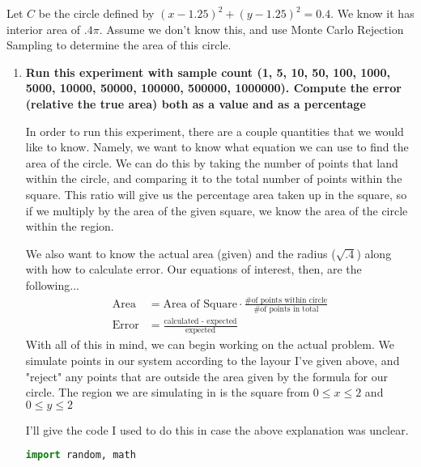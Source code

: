 \documentclass[11pt]{article}
\begin{document}
    Let $C$ be the circle defined by $(x-1.25)^2 + (y-1.25)^2=0.4$. We know it
    has interior area of $.4\pi$. Assume we don't know this, and use Monte
    Carlo Rejection Sampling to determine the area of this circle.

    \begin{enumerate}
        \item \textbf{Run this experiment with sample count (1, 5, 10, 50, 100, 1000, 
            5000, 10000, 50000, 100000, 500000, 1000000).  Compute the error 
            (relative the true area) both as a value and as a percentage}

            In order to run this experiment, there are a couple quantities that
            we would like to know. Namely, we want to know what equation we can
            use to find the area of the circle. We can do this by taking the
            number of points that land within the circle, and comparing it to
            the total number of points within the square. This ratio will give
            us the percentage area taken up in the square, so if we multiply by
            the area of the given square, we know the area of the circle within
            the region.

            We also want to know the actual area (given) and the radius ($\sqrt{.4}$)
            along with how to calculate error. Our equations of interest, then,
            are the following...
            \begin{align*}
                \text{Area} &= \text{Area of Square} \cdot \frac{\text{\# of 
                points within circle}}{\text{\# of points in total}} \\
                \text{Error} &= \frac{\text{calculated - expected}}
                {\text{expected}} 
            \end{align*}
            With all of this in mind, we can begin working on the actual
            problem. We simulate points in our system according to the layour
            I've given above, and "reject" any points that are outside the area
            given by the formula for our circle. The region we are simulating
            in is the square from $0 \leq x \leq 2$ and $0 \leq y \leq 2$

            I'll give the code I used to do this in case the above
            explanation was unclear.
            \newpage

            \begin{lstlisting}[style=mystyle, linewidth=0.94\linewidth, 
                                language=Python, gobble=12, caption=Monte Carlo
                                Rejection Sampling for Area of Circle]
                import random, math


\end{lstlisting}
\end{enumerate}
\end{document}
